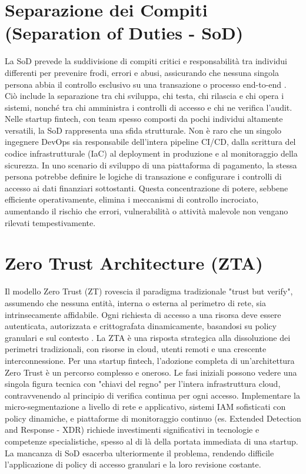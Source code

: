 \section{Separazione dei Compiti (Separation of Duties - SoD)}
La SoD prevede la suddivisione di compiti critici e responsabilità tra individui differenti per prevenire frodi, errori e abusi, assicurando che nessuna singola persona abbia il controllo esclusivo su una transazione o processo end-to-end \cite{OSCAL_Content}. Ciò include la separazione tra chi sviluppa, chi testa, chi rilascia e chi opera i sistemi, nonché tra chi amministra i controlli di accesso e chi ne verifica l'audit.
Nelle startup fintech, con team spesso composti da pochi individui altamente versatili, la SoD rappresenta una sfida strutturale. Non è raro che un singolo ingegnere DevOps sia responsabile dell'intera pipeline CI/CD, dalla scrittura del codice infrastrutturale (IaC) al deployment in produzione e al monitoraggio della sicurezza. In uno scenario di sviluppo di una piattaforma di pagamento, la stessa persona potrebbe definire le logiche di transazione e configurare i controlli di accesso ai dati finanziari sottostanti. Questa concentrazione di potere, sebbene efficiente operativamente, elimina i meccanismi di controllo incrociato, aumentando il rischio che errori, vulnerabilità o attività malevole non vengano rilevati tempestivamente.

\section{Zero Trust Architecture (ZTA)}
Il modello Zero Trust (ZT) rovescia il paradigma tradizionale "trust but verify", assumendo che nessuna entità, interna o esterna al perimetro di rete, sia intrinsecamente affidabile. Ogni richiesta di accesso a una risorsa deve essere autenticata, autorizzata e crittografata dinamicamente, basandosi su policy granulari e sul contesto \cite{NIST_SP_800_207}. La ZTA è una risposta strategica alla dissoluzione dei perimetri tradizionali, con risorse in cloud, utenti remoti e una crescente interconnessione.
Per una startup fintech, l'adozione completa di un'architettura Zero Trust è un percorso complesso e oneroso. Le fasi iniziali possono vedere una singola figura tecnica con "chiavi del regno" per l'intera infrastruttura cloud, contravvenendo al principio di verifica continua per ogni accesso. Implementare la micro-segmentazione a livello di rete e applicativo, sistemi IAM sofisticati con policy dinamiche, e piattaforme di monitoraggio continuo (es. Extended Detection and Response - XDR) richiede investimenti significativi in tecnologie e competenze specialistiche, spesso al di là della portata immediata di una startup. La mancanza di SoD esacerba ulteriormente il problema, rendendo difficile l'applicazione di policy di accesso granulari e la loro revisione costante.
